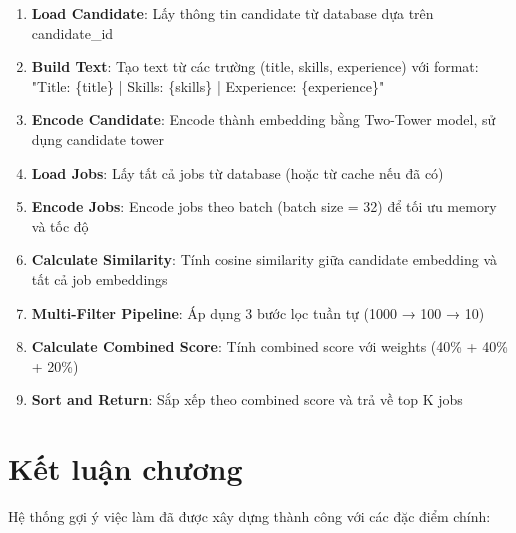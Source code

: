 \begin{enumerate}
    \item \textbf{Load Candidate}: Lấy thông tin candidate từ database dựa trên candidate\_id
    \item \textbf{Build Text}: Tạo text từ các trường (title, skills, experience) với format: "Title: \{title\} | Skills: \{skills\} | Experience: \{experience\}"
    \item \textbf{Encode Candidate}: Encode thành embedding bằng Two-Tower model, sử dụng candidate tower
    \item \textbf{Load Jobs}: Lấy tất cả jobs từ database (hoặc từ cache nếu đã có)
    \item \textbf{Encode Jobs}: Encode jobs theo batch (batch size = 32) để tối ưu memory và tốc độ
    \item \textbf{Calculate Similarity}: Tính cosine similarity giữa candidate embedding và tất cả job embeddings
    \item \textbf{Multi-Filter Pipeline}: Áp dụng 3 bước lọc tuần tự (1000 → 100 → 10)
    \item \textbf{Calculate Combined Score}: Tính combined score với weights (40\% + 40\% + 20\%)
    \item \textbf{Sort and Return}: Sắp xếp theo combined score và trả về top K jobs
\end{enumerate}

\section{Kết luận chương}

Hệ thống gợi ý việc làm đã được xây dựng thành công với các đặc điểm chính:

